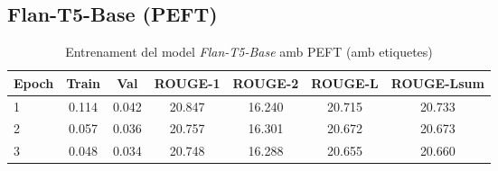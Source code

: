 \subsection{Flan-T5-Base (PEFT)}
\begin{table}[H]
    \centering
    \label{tab:additional-training}
    \begin{tabular}{lcccccc}
    \toprule
    Epoch & Train & Val & ROUGE-1 & ROUGE-2 & ROUGE-L & ROUGE-Lsum \\
    \midrule
    1 & 0.114 & 0.042 & 20.847 & 16.240 & 20.715 & 20.733 \\
    2 & 0.057 & 0.036 & 20.757 & 16.301 & 20.672 & 20.673 \\
    3 & 0.048 & 0.034 & 20.748 & 16.288 & 20.655 & 20.660 \\
    \bottomrule
    \end{tabular}
    \caption[Entrenament del model \textit{Flan-T5-Base} amb PEFT]{Entrenament del model \textit{Flan-T5-Base} amb PEFT (amb etiquetes)}
\end{table}
